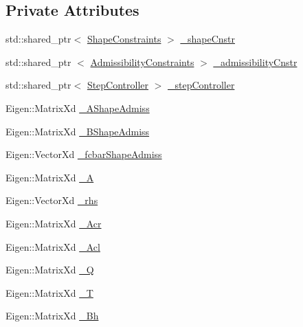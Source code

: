 \subsection*{\-Private \-Attributes}
\begin{DoxyCompactItemize}
\item 
std\-::shared\-\_\-ptr$<$ \hyperlink{classShapeConstraints}{\-Shape\-Constraints} $>$ \hyperlink{classMIQPLinearConstraints_a5c8788e52f7b0664606662cfa758ae88}{\-\_\-shape\-Cnstr}
\item 
std\-::shared\-\_\-ptr\*
$<$ \hyperlink{classAdmissibilityConstraints}{\-Admissibility\-Constraints} $>$ \hyperlink{classMIQPLinearConstraints_a1ac00fe6aca254b4dd8568e199bd20a4}{\-\_\-admissibility\-Cnstr}
\item 
std\-::shared\-\_\-ptr$<$ \hyperlink{classStepController}{\-Step\-Controller} $>$ \hyperlink{classMIQPLinearConstraints_ac1ea7dbfb54c84c9c3e172d36aa42671}{\-\_\-step\-Controller}
\item 
\-Eigen\-::\-Matrix\-Xd \hyperlink{classMIQPLinearConstraints_a7ff7b3584cf9ff3e2124d80bd0684180}{\-\_\-\-A\-Shape\-Admiss}
\item 
\-Eigen\-::\-Matrix\-Xd \hyperlink{classMIQPLinearConstraints_ab3ea8be40c22fa7d8035c7b5c5c1010c}{\-\_\-\-B\-Shape\-Admiss}
\item 
\-Eigen\-::\-Vector\-Xd \hyperlink{classMIQPLinearConstraints_a4e1cac634590c04e81d9b9341088efeb}{\-\_\-fcbar\-Shape\-Admiss}
\item 
\-Eigen\-::\-Matrix\-Xd \hyperlink{classMIQPLinearConstraints_a5dfdc7553c4cbbe75ac54b34c4f29732}{\-\_\-\-A}
\item 
\-Eigen\-::\-Vector\-Xd \hyperlink{classMIQPLinearConstraints_ac8df74075c393100f5bddcb371503530}{\-\_\-rhs}
\item 
\-Eigen\-::\-Matrix\-Xd \hyperlink{classMIQPLinearConstraints_a26250a3f878cdacc0fa0c5ccf04d0bed}{\-\_\-\-Acr}
\item 
\-Eigen\-::\-Matrix\-Xd \hyperlink{classMIQPLinearConstraints_a100ca667cae697cda19ae4aef3543120}{\-\_\-\-Acl}
\item 
\-Eigen\-::\-Matrix\-Xd \hyperlink{classMIQPLinearConstraints_afecaf6e02135bfba45045fab6cce3511}{\-\_\-\-Q}
\item 
\-Eigen\-::\-Matrix\-Xd \hyperlink{classMIQPLinearConstraints_a5e6d37521f3da248b19ff424526d700a}{\-\_\-\-T}
\item 
\-Eigen\-::\-Matrix\-Xd \hyperlink{classMIQPLinearConstraints_a0c0fbbb1b86c5d51a133ee661977c1f5}{\-\_\-\-Bh}
\item 

\end{DoxyCompactItemize}
